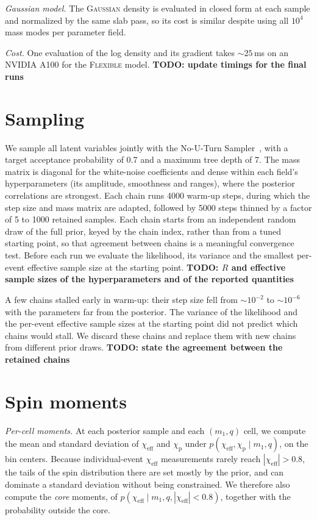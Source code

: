 \documentclass[%
 onecolumn,
 amsmath,amssymb,
 aps,
 prl,
 nofootinbib,nobibnotes,
]{revtex4-2}
\newcommand{\chieff}{\ensuremath{\chi_{\mathrm{eff}}}}
\newcommand{\chip}{\ensuremath{\chi_{\mathrm{p}}}}
\newcommand{\todo}[1]{{\color{Blue}\bf TODO: #1}}
\newcommand{\flexiblespins}{\textsc{Flexible}\xspace}
\newcommand{\gaussianspins}{\textsc{Gaussian}\xspace}
\begin{document}
\textit{Gaussian model.} The \gaussianspins density is evaluated in closed form at each sample and normalized by the same slab pass, so its cost is similar despite using all $10^4$ mass modes per parameter field.

\textit{Cost.} One evaluation of the log density and its gradient takes $\sim 25$\,ms on an NVIDIA A100 for the \flexiblespins model. \todo{update timings for the final runs}

\section{Sampling}
\label{sm: sampling}

We sample all latent variables jointly with the No-U-Turn Sampler~\cite{Hoffman:2014nuts}, with a target acceptance probability of 0.7 and a maximum tree depth of 7. The mass matrix is diagonal for the white-noise coefficients and dense within each field's hyperparameters (its amplitude, smoothness and ranges), where the posterior correlations are strongest. Each chain runs 4000 warm-up steps, during which the step size and mass matrix are adapted, followed by 5000 steps thinned by a factor of 5 to 1000 retained samples. Each chain starts from an independent random draw of the full prior, keyed by the chain index, rather than from a tuned starting point, so that agreement between chains is a meaningful convergence test. Before each run we evaluate the likelihood, its variance and the smallest per-event effective sample size at the starting point. \todo{$\hat{R}$ and effective sample sizes of the hyperparameters and of the reported quantities}

A few chains stalled early in warm-up: their step size fell from $\sim 10^{-2}$ to $\sim 10^{-6}$ with the parameters far from the posterior. The variance of the likelihood and the per-event effective sample sizes at the starting point did not predict which chains would stall. We discard these chains and replace them with new chains from different prior draws. \todo{state the agreement between the retained chains}

\section{Spin moments}
\label{sm: moments}

\textit{Per-cell moments.} At each posterior sample and each $(m_1, q)$ cell, we compute the mean and standard deviation of $\chieff$ and $\chip$ under $p(\chieff, \chip \mid m_1, q)$, on the bin centers. Because individual-event $\chieff$ measurements rarely reach $|\chieff| > 0.8$, the tails of the spin distribution there are set mostly by the prior, and can dominate a standard deviation without being constrained. We therefore also compute the \emph{core} moments, of $p(\chieff \mid m_1, q, |\chieff| < 0.8)$, together with the probability outside the core.
\end{document}
